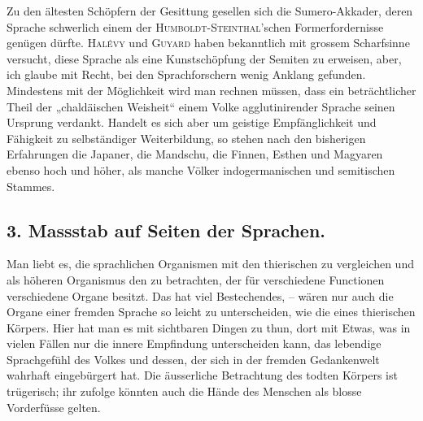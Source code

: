 \largerpage[-1]%

\begin{sloppypar}Zu den ältesten Schöpfern der Gesittung gesellen sich die Sumero-Akkader, deren Sprache schwerlich einem der \textsc{Humboldt-Steinthal}’schen Formerfordernisse genügen dürfte. \textsc{Halévy} und \textsc{Guyard} haben bekanntlich mit grossem Scharfsinne versucht, diese Sprache als eine Kunstschöpfung der Semiten zu erweisen, aber, ich glaube mit Recht, bei den Sprachforschern wenig Anklang gefunden. Mindestens mit der Möglichkeit wird man rechnen müssen, dass ein beträchtlicher Theil der „chaldäischen Weisheit“ einem Volke agglutinirender Sprache seinen Ursprung verdankt. Handelt es sich aber um geistige Empfänglichkeit und Fähigkeit zu selbständiger Weiterbildung, so stehen nach den bisherigen Erfahrungen die Japaner, die Mandschu, die Finnen, Esthen und Magyaren ebenso hoch und höher, als manche Völker indogermanischen und semitischen Stammes. \end{sloppypar}

\subsection*{3. Massstab auf Seiten der Sprachen.}\label{IV.IV.3}

Man liebt es, die sprachlichen Organismen mit den thierischen zu vergleichen und als höheren Organismus den zu betrachten, der für verschiedene Functionen verschiedene Organe besitzt. Das hat viel Bestechendes, – wären nur auch die Organe einer fremden Sprache so leicht zu unterscheiden, wie die eines \label{sp.390} thierischen Körpers. Hier hat man es mit sichtbaren Dingen zu thun, dort mit Etwas, was in vielen Fällen nur die innere Empfindung unterscheiden kann, das lebendige Sprachgefühl des Volkes und dessen, der sich in der fremden Gedankenwelt wahrhaft eingebürgert hat. Die äusserliche Betrachtung des todten Körpers ist trügerisch; ihr zufolge könnten auch die Hände des Menschen als blosse Vorderfüsse gelten.

